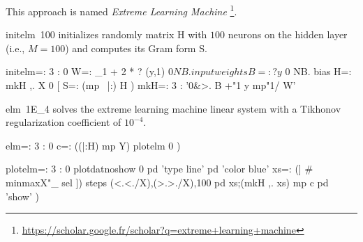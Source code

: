 \documentclass[10pt]{article}%
\begin{document}
This approach is named \emph{Extreme Learning Machine}
\footnote{\url{https://scholar.google.fr/scholar?q=extreme+learning+machine}}.

{\Tt{}initelm\ 100\nwendquote} initializes randomly matrix H with $100$ neurons on the hidden
layer (i.e., $M=100$) and computes its Gram form {\Tt{}S\nwendquote}.

\nwenddocs{}\endmoddef\nwstartdeflinemarkup{}\nwenddeflinemarkup
initelm=: 3 : 0
  W=: _1 + 2 * ? (y,1) $ 0 NB. input weights
  B=: ? y $ 0 NB. bias
  H=: mkH ,. X
  0 [ S=: (mp~ |:) H
)
mkH=: 3 : '0&>. B +"1 y mp"1/ W'

\nwendcode{}\nwdocspar
{\Tt{}elm\ 1E{\_}4\nwendquote} solves the extreme learning machine linear system with a Tikhonov
regularization coefficient of $10^{-4}$.

\nwenddocs{}\plusendmoddef\nwstartdeflinemarkup{}\nwenddeflinemarkup
elm=: 3 : 0
  c=: ((|:H) mp Y) %
  plotelm 0
)

\nwendcode{}\endmoddef\nwstartdeflinemarkup{}\nwenddeflinemarkup
plotelm=: 3 : 0
  plotdatnoshow 0
  pd 'type line'
  pd 'color blue'
  xs=: (] #~ minmaxX"_ sel ]) steps (<.<./X),(>.>./X),100
  pd xs;(mkH ,. xs) mp c
  pd 'show'
)
\end{document}
